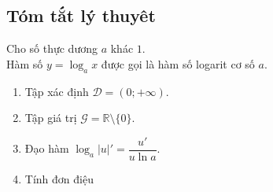 \subsection{Tóm tắt lý thuyêt}
\begin{dn}
	Cho số thực dương $a$ khác $1.$\\
	Hàm số $y=\log_a x $ được gọi là hàm số logarit cơ số $a.$
\end{dn}
\begin{enumerate}
	\item Tập xác định $\mathscr{D}=(0;+\infty).$
	\item Tập giá trị $\mathscr{G}= \mathbb{R}\setminus \{0\}.$
	\item Đạo hàm $\log_a |u|' =\dfrac{u'}{u\ln a}.$
	\item Tính đơn điệu
\end{enumerate}	
